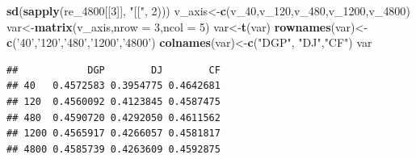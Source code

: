 \documentclass[
]{article}
\newenvironment{Shaded}{\begin{snugshade}}{\end{snugshade}}
\newcommand{\DataTypeTok}[1]{\textcolor[rgb]{0.13,0.29,0.53}{#1}}
\newcommand{\DecValTok}[1]{\textcolor[rgb]{0.00,0.00,0.81}{#1}}
\newcommand{\KeywordTok}[1]{\textcolor[rgb]{0.13,0.29,0.53}{\textbf{#1}}}
\newcommand{\NormalTok}[1]{#1}
\newcommand{\StringTok}[1]{\textcolor[rgb]{0.31,0.60,0.02}{#1}}
\begin{document}
\begin{Shaded}
\begin{Highlighting}[]
        \KeywordTok{sd}\NormalTok{(}\KeywordTok{sapply}\NormalTok{(re_}\DecValTok{4800}\NormalTok{[[}\DecValTok{3}\NormalTok{]], }\StringTok{"[["}\NormalTok{, }\DecValTok{2}\NormalTok{)))}
\NormalTok{v_axis<-}\KeywordTok{c}\NormalTok{(v_}\DecValTok{40}\NormalTok{,v_}\DecValTok{120}\NormalTok{,v_}\DecValTok{480}\NormalTok{,v_}\DecValTok{1200}\NormalTok{,v_}\DecValTok{4800}\NormalTok{)}
\NormalTok{var<-}\KeywordTok{matrix}\NormalTok{(v_axis,}\DataTypeTok{nrow =} \DecValTok{3}\NormalTok{,}\DataTypeTok{ncol =} \DecValTok{5}\NormalTok{)}
\NormalTok{var<-}\KeywordTok{t}\NormalTok{(var)}
\KeywordTok{rownames}\NormalTok{(var)<-}\KeywordTok{c}\NormalTok{(}\StringTok{'40'}\NormalTok{,}\StringTok{'120'}\NormalTok{,}\StringTok{'480'}\NormalTok{,}\StringTok{'1200'}\NormalTok{,}\StringTok{'4800'}\NormalTok{)}
\KeywordTok{colnames}\NormalTok{(var)<-}\KeywordTok{c}\NormalTok{(}\StringTok{"DGP"}\NormalTok{, }\StringTok{"DJ"}\NormalTok{,}\StringTok{"CF"}\NormalTok{)}
\NormalTok{var}
\end{Highlighting}
\end{Shaded}

\begin{verbatim}
##            DGP        DJ        CF
## 40   0.4572583 0.3954775 0.4642681
## 120  0.4560092 0.4123845 0.4587475
## 480  0.4590720 0.4292050 0.4611562
## 1200 0.4565917 0.4266057 0.4581817
## 4800 0.4585739 0.4263609 0.4592875
\end{verbatim}
\end{document}

